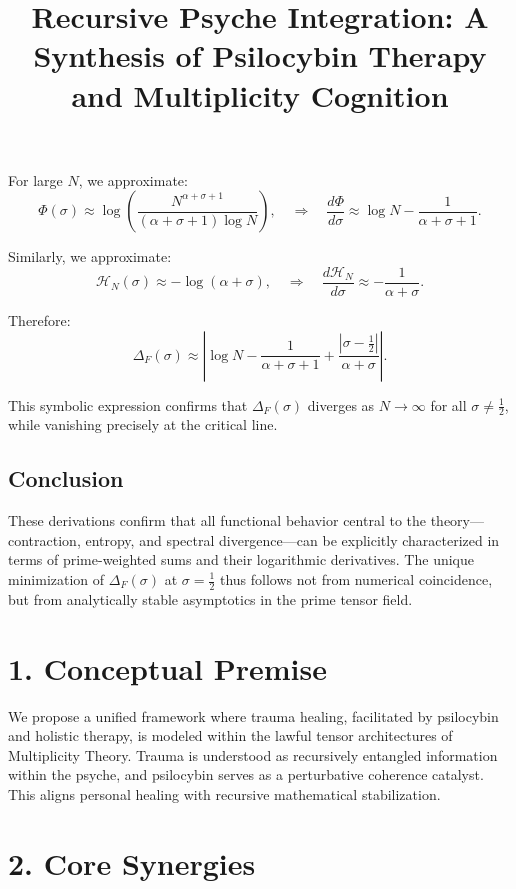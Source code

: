 \documentclass[12pt]{article}
\begin{document}
For large $N$, we approximate:
\[
\Phi(\sigma) \approx \log \left( \frac{N^{\alpha + \sigma + 1}}{(\alpha + \sigma + 1) \log N} \right), \quad \Rightarrow \quad \frac{d\Phi}{d\sigma} \approx \log N - \frac{1}{\alpha + \sigma + 1}.
\]

Similarly, we approximate:
\[
\mathcal{H}_N(\sigma) \approx -\log (\alpha + \sigma), \quad \Rightarrow \quad \frac{d\mathcal{H}_N}{d\sigma} \approx -\frac{1}{\alpha + \sigma}.
\]

Therefore:
\[
\Delta_F(\sigma) \approx \left| \log N - \frac{1}{\alpha + \sigma + 1} + \frac{|\sigma - \tfrac{1}{2}|}{\alpha + \sigma} \right|.
\]

This symbolic expression confirms that $\Delta_F(\sigma)$ diverges as $N \to \infty$ for all $\sigma \ne \tfrac{1}{2}$, while vanishing precisely at the critical line.

\subsection*{Conclusion}

These derivations confirm that all functional behavior central to the theory—contraction, entropy, and spectral divergence—can be explicitly characterized in terms of prime-weighted sums and their logarithmic derivatives. The unique minimization of $\Delta_F(\sigma)$ at $\sigma = \tfrac{1}{2}$ thus follows not from numerical coincidence, but from analytically stable asymptotics in the prime tensor field.

\title{Recursive Psyche Integration: A Synthesis of Psilocybin Therapy and Multiplicity Cognition}


\maketitle

\section*{1. Conceptual Premise}
We propose a unified framework where trauma healing, facilitated by psilocybin and holistic therapy, is modeled within the lawful tensor architectures of Multiplicity Theory. Trauma is understood as recursively entangled information within the psyche, and psilocybin serves as a perturbative coherence catalyst. This aligns personal healing with recursive mathematical stabilization.

\section*{2. Core Synergies}
\end{document}
